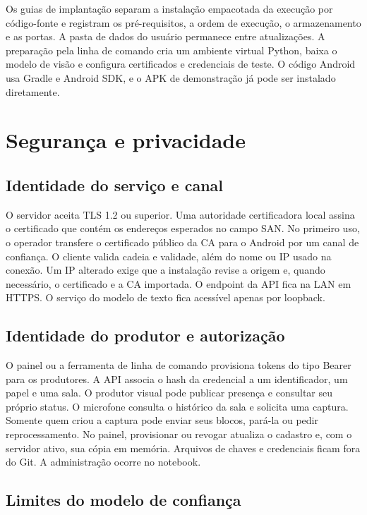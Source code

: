 \documentclass[12pt]{article}
\begin{document}
Os guias de implantação separam a instalação empacotada da execução por código-fonte e registram os pré-requisitos, a ordem de execução, o armazenamento e as portas. A pasta de dados do usuário permanece entre atualizações. A preparação pela linha de comando cria um ambiente virtual Python, baixa o modelo de visão e configura certificados e credenciais de teste. O código Android usa Gradle e Android SDK, e o APK de demonstração já pode ser instalado diretamente.

\section{Segurança e privacidade}

\subsection{Identidade do serviço e canal}

O servidor aceita TLS 1.2 ou superior. Uma autoridade certificadora local assina o certificado que contém os endereços esperados no campo SAN. No primeiro uso, o operador transfere o certificado público da CA para o Android por um canal de confiança. O cliente valida cadeia e validade, além do nome ou IP usado na conexão. Um IP alterado exige que a instalação revise a origem e, quando necessário, o certificado e a CA importada. O endpoint da API fica na LAN em HTTPS. O serviço do modelo de texto fica acessível apenas por loopback.

\subsection{Identidade do produtor e autorização}

O painel ou a ferramenta de linha de comando provisiona tokens do tipo Bearer para os produtores. A API associa o hash da credencial a um identificador, um papel e uma sala. O produtor visual pode publicar presença e consultar seu próprio status. O microfone consulta o histórico da sala e solicita uma captura. Somente quem criou a captura pode enviar seus blocos, pará-la ou pedir reprocessamento. No painel, provisionar ou revogar atualiza o cadastro e, com o servidor ativo, sua cópia em memória. Arquivos de chaves e credenciais ficam fora do Git. A administração ocorre no notebook.

\subsection{Limites do modelo de confiança}
\end{document}
